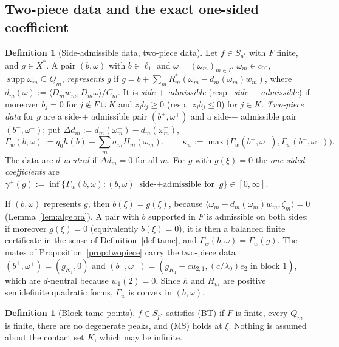\documentclass[10pt]{amsart}
\theoremstyle{definition}
\newtheorem{definition}[theorem]{Definition}
\theoremstyle{remark}
\newcommand{\supp}{\operatorname{supp}}
\newcommand{\ip}[2]{\langle #1,#2\rangle}
\begin{document}
\subsection{Two-piece data and the exact one-sided coefficient}

\begin{definition}[Side-admissible data, two-piece data]\label{def:twopiece}
Let $f\in S_{p^*}$ with $F$ finite, and $g\in X^*$.  A pair $(b,\omega)$
with $b\in\ell_1$ and $\omega=(\omega_m)_{m\in I}$, $\omega_m\in c_{00}$,
$\supp\omega_m\subseteq Q_m$, \emph{represents} $g$ if
$g=b+\sum_mR_m^*(\omega_m-d_m(\omega_m)w_m)$, where
$d_m(\omega):=\ip{D_mw_m}{D_m\omega}/C_m$.  It is \emph{side-$+$ admissible}
\textup{(}resp.\ \emph{side-$-$ admissible}\textup{)} if moreover $b_j=0$
for $j\notin F\cup K$ and $z_jb_j\ge0$ \textup{(}resp.\ $z_jb_j\le0$\textup{)}
for $j\in K$.  \emph{Two-piece data} for $g$ are a side-$+$ admissible pair
$(b^+,\omega^+)$ and a side-$-$ admissible pair $(b^-,\omega^-)$; put
$\Delta d_m:=d_m(\omega^-_m)-d_m(\omega^+_m)$,
\[
 \Gamma_w(b,\omega):=q_0h(b)+\sum_m\sigma_mH_m(\omega_m),\qquad
 \kappa_w:=\max\big(\Gamma_w(b^+,\omega^+),\Gamma_w(b^-,\omega^-)\big).
\]
The data are \emph{$d$-neutral} if $\Delta d_m=0$ for all $m$.  For $g$ with
$g(\xi)=0$ the \emph{one-sided coefficients} are
$\gamma^\pm(g):=\inf\{\Gamma_w(b,\omega):(b,\omega)\text{ side-$\pm$
admissible for }g\}\in[0,\infty]$.
\end{definition}

If $(b,\omega)$ represents $g$, then $b(\xi)=g(\xi)$, because
$\ip{\omega_m-d_m(\omega_m)w_m}{\zeta_m}=0$ (Lemma~\ref{lem:algebra}).  A
pair with $b$ supported in $F$ is admissible on both sides; if moreover
$g(\xi)=0$ (equivalently $b(\xi)=0$), it is then a balanced finite
certificate in the sense of Definition~\ref{def:tame}, and
$\Gamma_w(b,\omega)=\Gamma_w(g)$.  The mates of
Proposition~\ref{prop:twopiece} carry the two-piece data
$(b^+,\omega^+)=(g_{K_1},0)$ and $(b^-,\omega^-)=(g_{K_1}-cu_{2,1},
(c/\lambda_0)e_2\text{ in block }1)$, which are $d$-neutral because
$w_1(2)=0$.  Since $h$ and $H_m$ are positive semidefinite quadratic forms,
$\Gamma_w$ is convex in $(b,\omega)$.

\begin{definition}[Block-tame points]\label{def:BT}
$f\in S_{p^*}$ satisfies \textup{(BT)} if $F$ is finite, every $Q_m$ is
finite, there are no degenerate peaks, and \textup{(MS)} holds at $\xi$.
Nothing is assumed about the contact set $K$, which may be infinite.
\end{definition}
\end{document}
